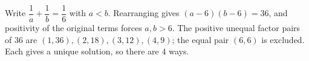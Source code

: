 Write $\dfrac{1}{a}+\dfrac{1}{b}=\dfrac{1}{6}$ with $a<b$. Rearranging gives $(a-6)(b-6)=36$, and positivity of the original terms forces $a,b>6$. The positive unequal factor pairs of 36 are $(1,36),(2,18),(3,12),(4,9)$; the equal pair $(6,6)$ is excluded. Each gives a unique solution, so there are $\boxed4$ ways.
